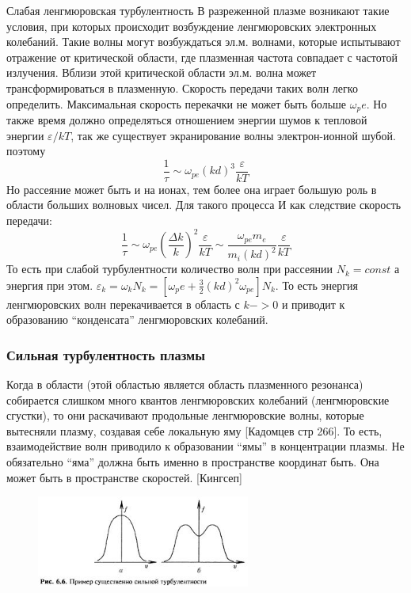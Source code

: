 \documentclass[10pt, a4paper]{article}
\begin{document}
Слабая ленгмюровская турбулентность
В разреженной плазме возникают такие условия, при которых происходит возбуждение ленгмюровских электронных колебаний. Такие волны могут возбуждаться эл.м. волнами, которые испытывают отражение от критической области, где плазменная частота совпадает с частотой излучения. Вблизи этой критической области эл.м. волна может трансформироваться в плазменную. Скорость передачи таких волн легко определить.
Максимальная скорость перекачки не может быть больше $\omega_pe$. Но также время должно определяться отношением энергии шумов к тепловой энергии $\varepsilon/kT$, так же существует экранирование волны электрон-ионной шубой. поэтому
\begin{equation}
\frac{1}{\tau} \sim \omega_{pe} (kd)^3 \frac{\varepsilon}{kT}
\end{equation}
Но рассеяние может быть и на ионах, тем более она играет большую роль в области больших волновых чисел. Для такого процесса
И как следствие скорость передачи:
\begin{equation}
\frac{1}{\tau} \sim \omega_{pe} (\frac{\Delta k}{k})^2 \frac{\varepsilon}{kT} \sim  \frac{\omega_{pe} m_e}{m_i (kd)^2}  \frac{\varepsilon}{kT}
\end{equation}
То есть при слабой турбулентности количество волн при рассеянии $N_k =const$ а энергия при этом. $\varepsilon_k = \omega_k N_k = [\omega_pe + \frac{3}{2} (kd)^2 \omega_{pe}]N_k$. То есть энергия ленгмюровских волн перекачивается в область с $k->0$ и приводит к образованию “конденсата” ленгмюровских колебаний.
\subsubsection{Сильная турбулентность плазмы}
Когда в области (этой областью является область плазменного резонанса) собирается слишком много квантов ленгмюровских колебаний (ленгмюровские сгустки), то они раскачивают продольные ленгмюровские волны, которые вытесняли плазму, создавая себе локальную яму [Кадомцев стр 266]. То есть, взаимодействие волн приводило к образовании “ямы” в концентрации плазмы.
Не обязательно “яма” должна быть именно в пространстве координат быть. Она может быть в пространстве скоростей. [Кингсеп]
\begin{figure}[h!]
	\begin{center}
		\includegraphics[width=70mm]{Turb_silnaya.JPG}
	\end{center}
\end{figure}
\end{document}

